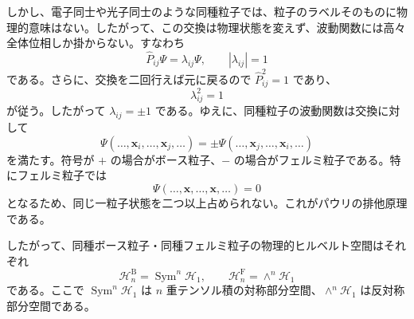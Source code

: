 しかし、電子同士や光子同士のような同種粒子では、粒子のラベルそのものに物理的意味はない。したがって、この交換は物理状態を変えず、波動関数には高々全体位相しか掛からない。すなわち
\[
\hat{P}_{ij}\Psi = \lambda_{ij}\Psi,
\qquad |\lambda_{ij}|=1
\]
である。さらに、交換を二回行えば元に戻るので $\hat{P}_{ij}^2=1$ であり、
\[
\lambda_{ij}^2=1
\]
が従う。したがって $\lambda_{ij}=\pm 1$ である。ゆえに、同種粒子の波動関数は交換に対して
\[
\Psi(\dots,\mathbf{x}_i,\dots,\mathbf{x}_j,\dots)
= \pm
\Psi(\dots,\mathbf{x}_j,\dots,\mathbf{x}_i,\dots)
\]
を満たす。符号が $+$ の場合がボース粒子、$-$ の場合がフェルミ粒子である。特にフェルミ粒子では
\[
\Psi(\dots,\mathbf{x},\dots,\mathbf{x},\dots)=0
\]
となるため、同じ一粒子状態を二つ以上占められない。これがパウリの排他原理である。

したがって、同種ボース粒子・同種フェルミ粒子の物理的ヒルベルト空間はそれぞれ
\[
\mathcal{H}_n^{\mathrm{B}} = \operatorname{Sym}^n \mathcal{H}_1,
\qquad
\mathcal{H}_n^{\mathrm{F}} = \wedge^n \mathcal{H}_1
\]
である。ここで $\operatorname{Sym}^n \mathcal{H}_1$ は $n$ 重テンソル積の対称部分空間、$\wedge^n \mathcal{H}_1$ は反対称部分空間である。
